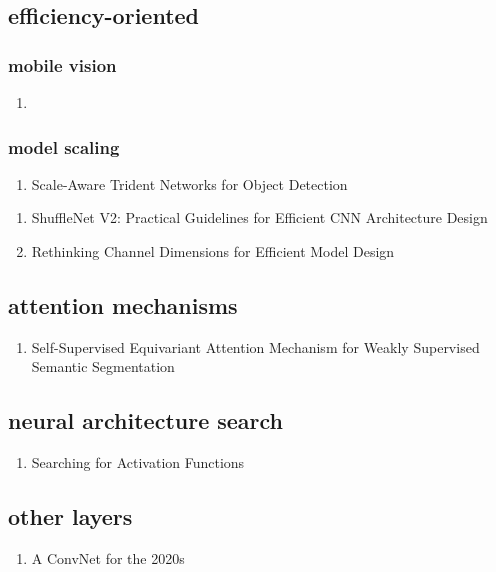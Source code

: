 \documentclass[acmlarge]{acmart}
\begin{document}
	\subsection{efficiency-oriented}
		\subsubsection{mobile vision}
		\begin{enumerate}
			\item
		\end{enumerate}
		\subsubsection{model scaling}
		\begin{enumerate}
			\item Scale-Aware Trident Networks for Object Detection \cite{Li2019ScaleAwareTN} 

		\end{enumerate}
	\begin{enumerate}
		\item ShuffleNet V2: Practical Guidelines for Efficient CNN Architecture Design \cite{Ma2018ShuffleNetVP} 

		\item Rethinking Channel Dimensions for Efficient Model Design \cite{Han2021RethinkingCD} 

	\end{enumerate}
	\subsection{attention mechanisms}
	\begin{enumerate}
		\item Self-Supervised Equivariant Attention Mechanism for Weakly Supervised Semantic Segmentation \cite{Wang2020SelfSupervisedEA} 

	\end{enumerate}
	\subsection{neural architecture search}
	\begin{enumerate}
		\item Searching for Activation Functions \cite{Ramachandran2018SearchingFA} 

	\end{enumerate}
	\subsection{other layers}
	\begin{enumerate}
		\item A ConvNet for the 2020s \cite{Liu2022ACF} 

	\end{enumerate}
\end{document}
